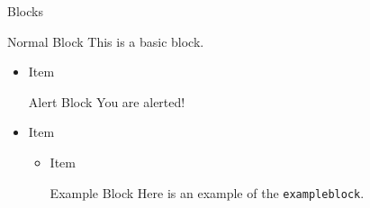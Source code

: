 \documentclass[t]{beamer}  %
\begin{document}
\begin{frame}[fragile]{Blocks}
  \begin{block}{Normal Block}
    This is a basic block.
  \end{block}

  \begin{itemize}
    \item Item
      \begin{alertblock}{Alert Block}
        You are alerted!
      \end{alertblock}
    \item Item
      \begin{itemize}
        \item Item
          \begin{exampleblock}{Example Block}
            Here is an example of the \verb|exampleblock|.
          \end{exampleblock}
      \end{itemize}
  \end{itemize}
\end{frame}
\end{document}

